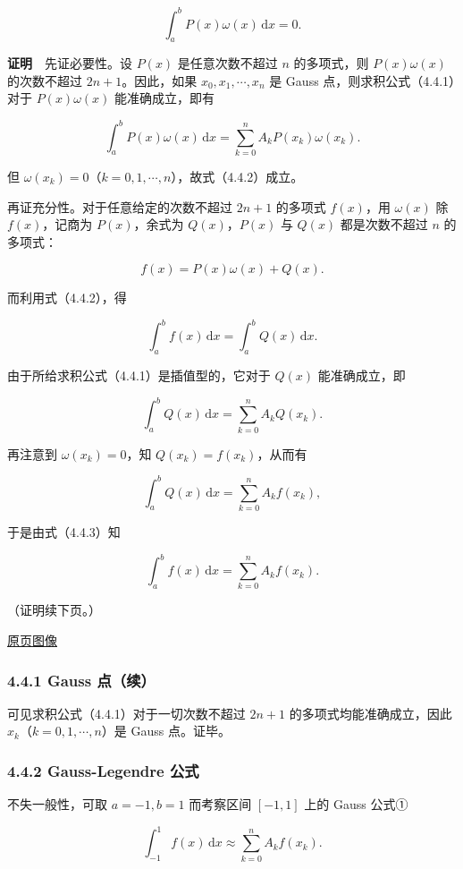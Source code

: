 \documentclass[
  10pt,
  fontset=fandol]{ctexart}
\begin{document}
\[
\int_a^b P(x)\omega(x)\,\mathrm{d}x=0.
\tag{4.4.2}
\]

\textbf{证明}　先证必要性。设 \(P(x)\) 是任意次数不超过 \(n\) 的多项式，则 \(P(x)\omega(x)\) 的次数不超过 \(2n+1\)。因此，如果 \(x_0,x_1,\cdots,x_n\) 是 Gauss 点，则求积公式（4.4.1）对于 \(P(x)\omega(x)\) 能准确成立，即有

\[
\int_a^b P(x)\omega(x)\,\mathrm{d}x
=\sum_{k=0}^{n}A_kP(x_k)\omega(x_k).
\]

但 \(\omega(x_k)=0\)（\(k=0,1,\cdots,n\)），故式（4.4.2）成立。

再证充分性。对于任意给定的次数不超过 \(2n+1\) 的多项式 \(f(x)\)，用 \(\omega(x)\) 除 \(f(x)\)，记商为 \(P(x)\)，余式为 \(Q(x)\)，\(P(x)\) 与 \(Q(x)\) 都是次数不超过 \(n\) 的多项式：

\[
f(x)=P(x)\omega(x)+Q(x).
\]

而利用式（4.4.2），得

\[
\int_a^b f(x)\,\mathrm{d}x=\int_a^b Q(x)\,\mathrm{d}x.
\tag{4.4.3}
\]

由于所给求积公式（4.4.1）是插值型的，它对于 \(Q(x)\) 能准确成立，即

\[
\int_a^b Q(x)\,\mathrm{d}x=\sum_{k=0}^{n}A_kQ(x_k).
\]

再注意到 \(\omega(x_k)=0\)，知 \(Q(x_k)=f(x_k)\)，从而有

\[
\int_a^b Q(x)\,\mathrm{d}x=\sum_{k=0}^{n}A_kf(x_k),
\]

于是由式（4.4.3）知

\[
\int_a^b f(x)\,\mathrm{d}x=\sum_{k=0}^{n}A_kf(x_k).
\]

（证明续下页。）

\href{../../source-images/pdf-108.jpeg}{原页图像}

\subsubsection{4.4.1 Gauss 点（续）}\label{gauss-ux70b9ux7eed}

可见求积公式（4.4.1）对于一切次数不超过 \(2n+1\) 的多项式均能准确成立，因此 \(x_k\)（\(k=0,1,\cdots,n\)）是 Gauss 点。证毕。

\subsubsection{4.4.2 Gauss-Legendre 公式}\label{gauss-legendre-ux516cux5f0f}

不失一般性，可取 \(a=-1,b=1\) 而考察区间 \([-1,1]\) 上的 Gauss 公式①

\[
\int_{-1}^{1}f(x)\,\mathrm{d}x\approx\sum_{k=0}^{n}A_kf(x_k).
\tag{4.4.4}
\]
\end{document}
